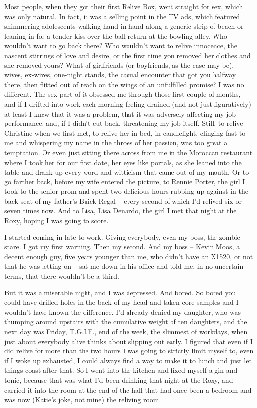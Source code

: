 \documentclass[11pt,a4paper]{article}
\begin{document}
Most people, when they got their first Relive Box, went straight for sex, which was only natural. In fact, it was a selling point in the TV ads, which featured shimmering adolescents walking hand in hand along a generic strip of beach or leaning in for a tender kiss over the ball return at the bowling alley. Who wouldn't want to go back there? Who wouldn't want to relive innocence, the nascent stirrings of love and desire, or the first time you removed her clothes and she removed yours? What of girlfriends (or boyfriends, as the case may be), wives, ex-wives, one-night stands, the casual encounter that got you halfway there, then flitted out of reach on the wings of an unfulfilled promise? I was no different. The sex part of it obsessed me through those first couple of months, and if I drifted into work each morning feeling drained (and not just figuratively) at least I knew that it was a problem, that it was adversely affecting my job performance, and, if I didn't cut back, threatening my job itself. Still, to relive Christine when we first met, to relive her in bed, in candlelight, clinging fast to me and whispering my name in the throes of her passion, was too great a temptation. Or even just sitting there across from me in the Moroccan restaurant where I took her for our first date, her eyes like portals, as she leaned into the table and drank up every word and witticism that came out of my mouth. Or to go farther back, before my wife entered the picture, to Rennie Porter, the girl I took to the senior prom and spent two delicious hours rubbing up against in the back seat of my father's Buick Regal – every second of which I'd relived six or seven times now. And to Lisa, Lisa Denardo, the girl I met that night at the Roxy, hoping I was going to score.

I started coming in late to work. Giving everybody, even my boss, the zombie stare. I got my first warning. Then my second. And my boss – Kevin Moos, a decent enough guy, five years younger than me, who didn't have an X1520, or not that he was letting on – sat me down in his office and told me, in no uncertain terms, that there wouldn't be a third.

But it was a miserable night, and I was depressed. And bored. So bored you could have drilled holes in the back of my head and taken core samples and I wouldn't have known the difference. I'd already denied my daughter, who was thumping around upstairs with the cumulative weight of ten daughters, and the next day was Friday, T.G.I.F., end of the week, the slimmest of workdays, when just about everybody alive thinks about slipping out early. I figured that even if I did relive for more than the two hours I was going to strictly limit myself to, even if I woke up exhausted, I could always find a way to make it to lunch and just let things coast after that. So I went into the kitchen and fixed myself a gin-and-tonic, because that was what I'd been drinking that night at the Roxy, and carried it into the room at the end of the hall that had once been a bedroom and was now (Katie's joke, not mine) the reliving room.
\end{document}
